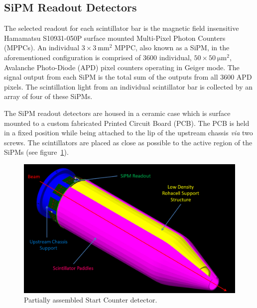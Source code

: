 \subsection{SiPM Readout Detectors}

The selected readout for each scintillator bar is the magnetic field insensitive Hamamatsu S10931-050P surface mounted Multi-Pixel Photon Counters (MPPCs)\cite{hamamatsu}.  An individual $\mathrm{3 \times 3\ mm^2}$ MPPC, also known as a SiPM, in the aforementioned configuration is comprised of 3600 individual, $\mathrm{50 \times 50\ \mu m^2}$, Avalanche Photo-Diode (APD) pixel counters operating in Geiger mode. The signal output from each SiPM is the total sum of the outputs from all 3600 APD pixels\cite{sipm_spec}.  The scintillation light from an individual scintillator bar is collected by an array of four of these SiPMs.

The SiPM readout detectors are housed in a ceramic case which is surface mounted to a custom fabricated Printed Circuit Board (PCB).  The PCB is held in a fixed position while being attached to the lip of the upstream chassis \emph{via} two screws.  The scintillators are placed as close as possible to the active region of the SiPMs (see figure~\ref{fig:Partially Assembled Start Counter}).
\begin{figure}[!htb]
	\centering
	\includegraphics[width=1.0\columnwidth]{design/figs/Labeled_Partially_Assembled_Detector}
	\caption[Partially assembled Start Counter detector]{Partially assembled Start Counter detector.}
	\label{fig:Partially Assembled Start Counter}
\end{figure}

